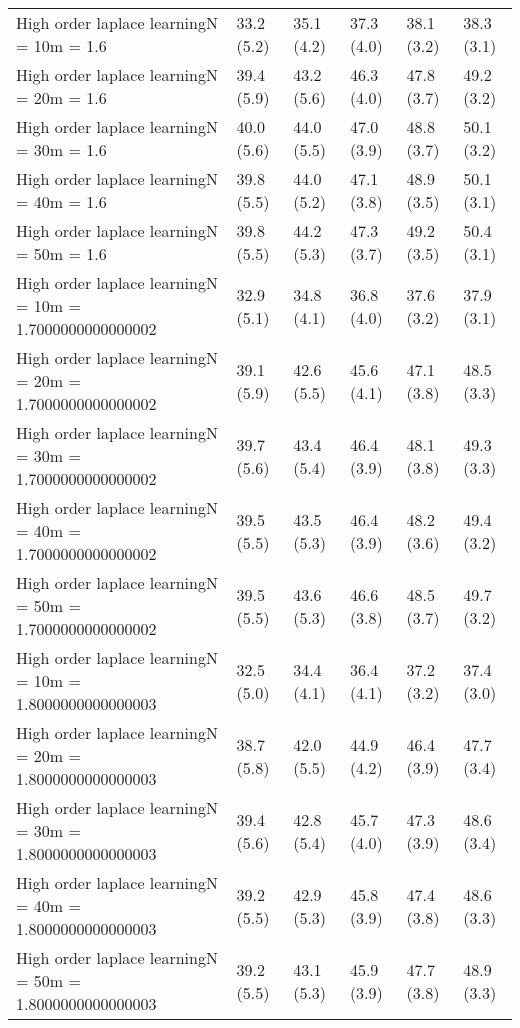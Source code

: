 \documentclass{article}
\begin{document}
\begin{table*}[t!]
\begin{center}
\begin{small}
\begin{sc}
\begin{tabular}{llllll}
High order laplace learningN = 10m = 1.6&33.2 (5.2)      &35.1 (4.2)      &37.3 (4.0)      &38.1 (3.2)      &38.3 (3.1)      \\
High order laplace learningN = 20m = 1.6&39.4 (5.9)      &43.2 (5.6)      &46.3 (4.0)      &47.8 (3.7)      &49.2 (3.2)      \\
High order laplace learningN = 30m = 1.6&40.0 (5.6)      &44.0 (5.5)      &47.0 (3.9)      &48.8 (3.7)      &50.1 (3.2)      \\
High order laplace learningN = 40m = 1.6&39.8 (5.5)      &44.0 (5.2)      &47.1 (3.8)      &48.9 (3.5)      &50.1 (3.1)      \\
High order laplace learningN = 50m = 1.6&39.8 (5.5)      &44.2 (5.3)      &47.3 (3.7)      &49.2 (3.5)      &50.4 (3.1)      \\
High order laplace learningN = 10m = 1.7000000000000002&32.9 (5.1)      &34.8 (4.1)      &36.8 (4.0)      &37.6 (3.2)      &37.9 (3.1)      \\
High order laplace learningN = 20m = 1.7000000000000002&39.1 (5.9)      &42.6 (5.5)      &45.6 (4.1)      &47.1 (3.8)      &48.5 (3.3)      \\
High order laplace learningN = 30m = 1.7000000000000002&39.7 (5.6)      &43.4 (5.4)      &46.4 (3.9)      &48.1 (3.8)      &49.3 (3.3)      \\
High order laplace learningN = 40m = 1.7000000000000002&39.5 (5.5)      &43.5 (5.3)      &46.4 (3.9)      &48.2 (3.6)      &49.4 (3.2)      \\
High order laplace learningN = 50m = 1.7000000000000002&39.5 (5.5)      &43.6 (5.3)      &46.6 (3.8)      &48.5 (3.7)      &49.7 (3.2)      \\
High order laplace learningN = 10m = 1.8000000000000003&32.5 (5.0)      &34.4 (4.1)      &36.4 (4.1)      &37.2 (3.2)      &37.4 (3.0)      \\
High order laplace learningN = 20m = 1.8000000000000003&38.7 (5.8)      &42.0 (5.5)      &44.9 (4.2)      &46.4 (3.9)      &47.7 (3.4)      \\
High order laplace learningN = 30m = 1.8000000000000003&39.4 (5.6)      &42.8 (5.4)      &45.7 (4.0)      &47.3 (3.9)      &48.6 (3.4)      \\
High order laplace learningN = 40m = 1.8000000000000003&39.2 (5.5)      &42.9 (5.3)      &45.8 (3.9)      &47.4 (3.8)      &48.6 (3.3)      \\
High order laplace learningN = 50m = 1.8000000000000003&39.2 (5.5)      &43.1 (5.3)      &45.9 (3.9)      &47.7 (3.8)      &48.9 (3.3)      \\

\end{tabular}
\end{sc}
\end{small}
\end{center}
\end{table*}
\end{document}
